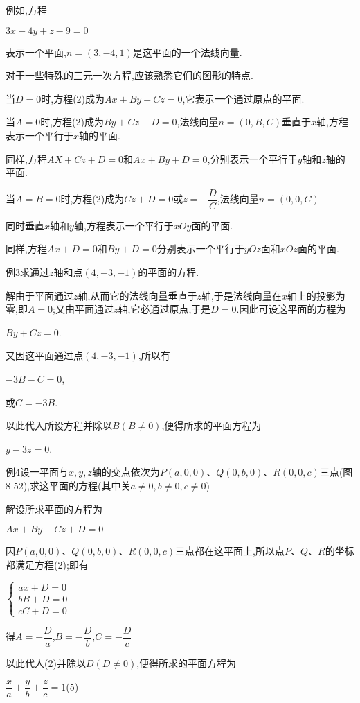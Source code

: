 \documentclass[oneside]{book}
\begin{document}
例如,方程

$3x - 4y + z - 9 = 0$

表示一个平面,$n = (3, - 4,1)$是这平面的一个法线向量.

对于一些特殊的三元一次方程,应该熟悉它们的图形的特点.

当$D=0$时,方程(2)成为$Ax + By + Cz = 0$,它表示一个通过原点的平面.

当$A=0$时,方程(2)成为$By + Cz + D = 0$,法线向量$n=(0,B,C)$垂直于$x$轴,方程表示一个平行于$x$轴的平面.

同样,方程$AX + Cz + D = 0$和$Ax+By+D=0$,分别表示一个平行于$y$轴和$z$轴的平面.

当$A=B=0$时,方程(2)成为$Cz + D = $0或$z =  - \dfrac{D}{C}$,法线向量$n=(0,0,C)$

同时垂直$x$轴和$y$轴,方程表示一个平行于$xOy$面的平面.

同样,方程$Ax+D=0$和$By + D = 0$分别表示一个平行于$yOz$面和$xOz$面的平面.

例3求通过$z$轴和点$(4,-3,-1)$的平面的方程.

解由于平面通过$z$轴,从而它的法线向量垂直于$z$轴,于是法线向量在$x$轴上的投影为零,即$A=0$;又由平面通过$z$轴,它必通过原点,于是$D=0$.因此可设这平面的方程为

$By + Cz = 0$.

又因这平面通过点$(4,-3,-1)$,所以有

$ - 3B - C = 0$,

或$C =  - 3B$.

以此代入所设方程并除以$B(B \ne 0)$,便得所求的平面方程为

$y - 3z = 0$.

例4设一平面与$x,y,z$轴的交点依次为$P(a,0,0)$、$Q(0,b,0)$、$R(0,0,c)$三点(图8-52),求这平面的方程(其中关$a \ne 0,b \ne 0,c \ne 0$)

解设所求平面的方程为

$Ax + By + Cz + D = 0$

因$P(a,0,0)$、$Q(0,b,0)$、$R(0,0,c)$三点都在这平面上,所以点$P$、$Q$、$R$的坐标都满足方程(2);即有

$\left\{\begin{array}{l}{a x+D=0} \\ {b B+D=0} \\ {c C+D=0}\end{array}\right.$

得$A =  - \dfrac{D}{a}$,$B =  - \dfrac{D}{b}$,$C =  - \dfrac{D}{c}$

以此代人(2)并除以$D(D \ne 0)$,便得所求的平面方程为

$\dfrac{x}{a} + \dfrac{y}{b} + \dfrac{z}{c} = 1$\quad (5)
\end{document}
